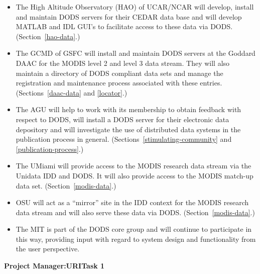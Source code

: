 \documentclass[12pt]{article}
\begin{document}
\begin{itemize}
\item The High Altitude Observatory (\ac{HAO}) of \ac{UCAR}/\ac{NCAR} 
will develop, install and maintain \ac{DODS} servers for their 
\ac{CEDAR} data base and will develop \acl{MATLAB} and \ac{IDL} 
\ac{GUI}'s to facilitate access to these data via \ac{DODS}. 
(Section~\ref{hao-data}.)

\item The \ac{GCMD} of \ac{GSFC} will install and maintain \ac{DODS} 
servers at the Goddard \ac{DAAC} for the \acs{MODIS} level 2 and level 3 
data stream. They will also maintain a directory of \ac{DODS} compliant 
data sets and manage the registration and maintenance process 
associated with these entries. (Sections~\ref{daac-data} and 
\ref{locator}.)

\item The \acl{AGU} will help to work with its membership to obtain 
feedback with respect to \ac{DODS}, will install a \ac{DODS} server 
for their electronic data depository and will investigate the use of 
distributed data systems in the publication process in general. 
(Sections~\ref{stimulating-community} and \ref{publication-process}.) 

\item The \acl{UMiami} will provide access to the \acs{MODIS} research 
data stream via the Unidata \ac{IDD} and \ac{DODS}. It will also 
provide access to the \acs{MODIS} match-up data set. 
(Section~\ref{modis-data}.)

\item \acl{OSU} will act as a ``mirror'' site in the \ac{IDD} context 
for the \acs{MODIS} research data stream and will also serve these 
data via \ac{DODS}. (Section~\ref{modis-data}.)

\item The \acl{MIT} is part of the \ac{DODS} core group and will
continue to participate in this way, providing input with regard to 
system design and functionality from the user perspective.
\end{itemize}

\baselineskip 12pt

\clearpage
{}
\bigskip

\begin{center}
{\large \bf Project Manager:URITask 1}
\end{center}
\end{document}
